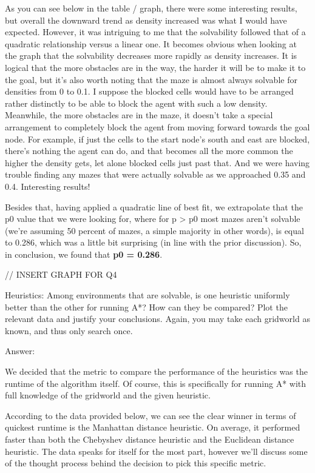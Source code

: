 \documentclass{homeworg}
\begin{document}
As you can see below in the table / graph, there were some interesting results, but overall the downward trend as density increased was what I would have expected. However, it was intriguing to me that the solvability followed that of a quadratic relationship versus a linear one. It becomes obvious when looking at the graph that the solvability decreases more rapidly as density increases. It is logical that the more obstacles are in the way, the harder it will be to make it to the goal, but it's also worth noting that the maze is almost always solvable for densities from 0 to 0.1. I suppose the blocked cells would have to be arranged rather distinctly to be able to block the agent with such a low density. Meanwhile, the more obstacles are in the maze, it doesn't take a special arrangement to completely block the agent from moving forward towards the goal node. For example, if just the cells to the start node's south and east are blocked, there's nothing the agent can do, and that becomes all the more common the higher the density gets, let alone blocked cells just past that. And we were having trouble finding any mazes that were actually solvable as we approached 0.35 and 0.4. Interesting results!

Besides that, having applied a quadratic line of best fit, we extrapolate that the p0 value that we were looking for, where for p > p0 most mazes aren’t solvable (we're assuming 50 percent of mazes, a simple majority in other words), is equal to 0.286, which was a little bit surprising (in line with the prior discussion). So, in conclusion, we found that \textbf{p0 = 0.286}.

// INSERT GRAPH FOR Q4

\newpage
\exercise*
Heuristics: Among environments that are solvable, is one heuristic uniformly better than the other for running A*? How can they be compared? Plot the relevant data and justify your conclusions. Again, you may take each gridworld as known, and thus only search once.

Answer:

We decided that the metric to compare the performance of the heuristics was the runtime of the algorithm itself. Of course, this is specifically for running A* with full knowledge of the gridworld and the given heuristic.

According to the data provided below, we can see the clear winner in terms of quickest runtime is the Manhattan distance heuristic. On average, it performed faster than both the Chebyshev distance heuristic and the Euclidean distance heuristic. The data speaks for itself for the most part, however we'll discuss some of the thought process behind the decision to pick this specific metric.
\end{document}
